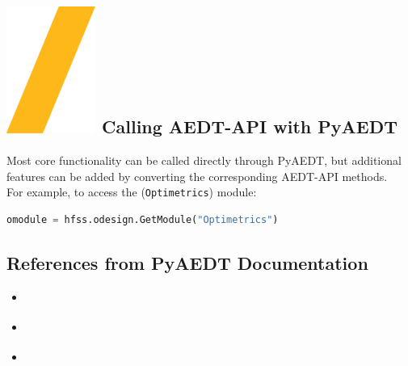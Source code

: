 \documentclass[9pt,landscape]{article}
\begin{document}
\begin{multicols}{3}
\section{\includegraphics[height=\fontcharht\font`\S]{slash.png} Calling AEDT-API with PyAEDT}
Most core functionality can be called directly through PyAEDT, but additional features can be added by converting the corresponding AEDT-API methods.
\newline
\\
For example, to access the (\texttt{Optimetrics}) module:
\begin{lstlisting}[language=Python]
omodule = hfss.odesign.GetModule("Optimetrics")
\end{lstlisting}

\subsection{References from PyAEDT Documentation}
\begin{itemize}
\item \href{https://aedt.docs.pyansys.com/version/stable/Getting_started/index.html}{\color{blue}{Getting Started}}
\item \href{https://aedt.docs.pyansys.com/version/stable/User_guide/index.html}{\color{blue}{User Guide}}
\item \href{https://aedt.docs.pyansys.com/version/stable/API/index.html}{\color{blue}{API Reference}}
\end{itemize}
\end{multicols}
\vspace{-0.15cm}
\noindent\makebox[\linewidth]{\rule{\paperwidth}{4pt}}
\end{document}

